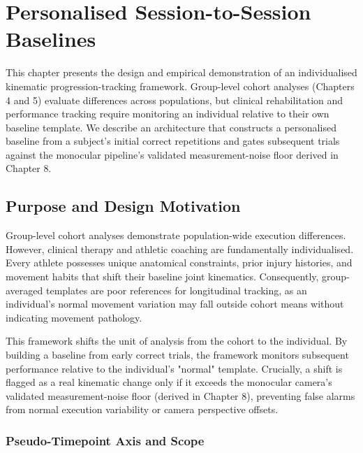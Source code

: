 \chapter{Personalised Session-to-Session Baselines}
\label{ch:baseline}



This chapter presents the design and empirical demonstration of an individualised kinematic progression-tracking framework. Group-level cohort analyses (Chapters 4 and 5) evaluate differences across populations, but clinical rehabilitation and performance tracking require monitoring an individual relative to their own baseline template. We describe an architecture that constructs a personalised baseline from a subject's initial correct repetitions and gates subsequent trials against the monocular pipeline's validated measurement-noise floor derived in Chapter 8.



\section{Purpose and Design Motivation}
\label{sec:9-1-purpose-and-design-motivation}


Group-level cohort analyses demonstrate population-wide execution differences. However, clinical therapy and athletic coaching are fundamentally individualised. Every athlete possesses unique anatomical constraints, prior injury histories, and movement habits that shift their baseline joint kinematics. Consequently, group-averaged templates are poor references for longitudinal tracking, as an individual's normal movement variation may fall outside cohort means without indicating movement pathology.

This framework shifts the unit of analysis from the cohort to the individual. By building a baseline from early correct trials, the framework monitors subsequent performance relative to the individual's "normal" template. Crucially, a shift is flagged as a real kinematic change only if it exceeds the monocular camera's validated measurement-noise floor (derived in Chapter 8), preventing false alarms from normal execution variability or camera perspective offsets.

\subsection{Pseudo-Timepoint Axis and Scope}
\label{sec:9-1-1-pseudo-timepoint-axis-and-scope}

